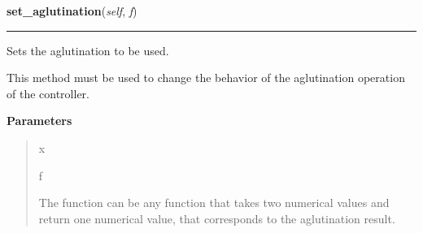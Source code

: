     \begin{boxedminipage}{\textwidth}

    \raggedright \textbf{set\_aglutination}(\textit{self}, \textit{f})

    \vspace{-1.5ex}

    \rule{\textwidth}{0.5\fboxrule}

Sets the aglutination to be used.

This method must be used to change the behavior of the aglutination
operation of the controller.
    \vspace{1ex}

      \textbf{Parameters}
      \begin{quote}
        \begin{Ventry}{x}

          \item[f]


The function can be any function that takes two numerical values and
return one numerical value, that corresponds to the aglutination
result.
        \end{Ventry}

      \end{quote}

    \vspace{1ex}

    \end{boxedminipage}

    \label{peach:fuzzy:control:Controller:add_rule}

    \vspace{0.5ex}

